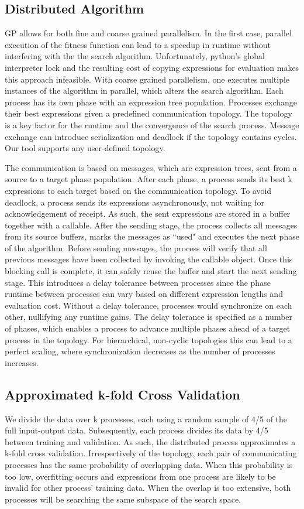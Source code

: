 \subsection{Distributed Algorithm}
GP allows for both fine and coarse grained parallelism. In the first case, parallel execution of the fitness function can lead to a speedup in runtime without interfering with the the search algorithm. Unfortunately, python's global interpreter lock and the resulting cost of copying expressions for evaluation makes this approach infeasible. With coarse grained parallelism, one executes multiple instances of the algorithm in parallel, which alters the search algorithm. Each process has its own phase with an expression tree population. Processes exchange their best expressions given a predefined communication topology. The topology is a key factor for the runtime and the convergence of the search process. Message exchange can introduce serialization and deadlock if the topology contains cycles. Our tool supports any user-defined topology. 

The communication is based on messages, which are expression trees, sent from a source to a target phase population.
After each phase, a process sends its best k expressions to each target based on the communication topology. To avoid deadlock, a process sends its expressions asynchronously, not waiting for acknowledgement of receipt. As such, the sent expressions are stored in a buffer together with a callable. After the sending stage, the process collects all messages from its source buffers, marks the messages as ``used" and executes the next phase of the algorithm. Before sending messages, the process will verify that all previous messages have been collected by invoking the callable object. Once this blocking call is complete, it can safely reuse the buffer and start the next sending stage. This introduces a delay tolerance between processes since the phase runtime between processes can vary based on different expression lengths and evaluation cost. Without a delay tolerance, processes would synchronize on each other, nullifying any runtime gains. The delay tolerance is specified as a number of phases, which enables a process to advance multiple phases ahead of a target process in the topology. 
For hierarchical, non-cyclic topologies this can lead to a perfect scaling, where synchronization decreases as the number of processes increases.

\subsection{Approximated k-fold Cross Validation}
We divide the data over k processes, each using a random sample of 4/5 of the full input-output data. Subsequently, each process divides its data by 4/5 between training and validation. As such, the distributed process approximates a k-fold cross validation. Irrespectively of the topology, each pair of communicating processes has the same probability of overlapping data. When this probability is too low, overfitting occurs and expressions from one process are likely to be invalid for other process' training data. When the overlap is too extensive, both processes will be searching the same subspace of the search space.

